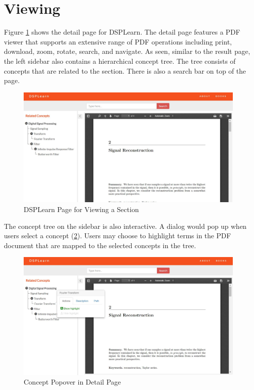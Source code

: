 \section{Viewing}
Figure \ref{fig:detail_page} shows the detail page for DSPLearn. The detail page features a PDF viewer that supports an extensive range of PDF operations including print, download, zoom, rotate, search, and navigate. As seen, similar to the result page, the left sidebar also contains a hierarchical concept tree. The tree consists of concepts that are related to the section. There is also a search bar on top of the page.

\begin{figure}[!htbp]
  \centering
  \includegraphics[width=\textwidth]{system_demonstration/demo_detail_page.jpg}
  \caption{DSPLearn Page for Viewing a Section}
  \label{fig:detail_page}
\end{figure}

The concept tree on the sidebar is also interactive. A dialog would pop up when users select a concept (\ref{fig:detail_popover}). Users may choose to highlight terms in the PDF document that are mapped to the selected concepts in the tree.

\begin{figure}[!htbp]
  \centering
  \includegraphics[width=\textwidth]{system_demonstration/demo_detail_popover.jpg}
  \caption{Concept Popover in Detail Page}
  \label{fig:detail_popover}
\end{figure}

